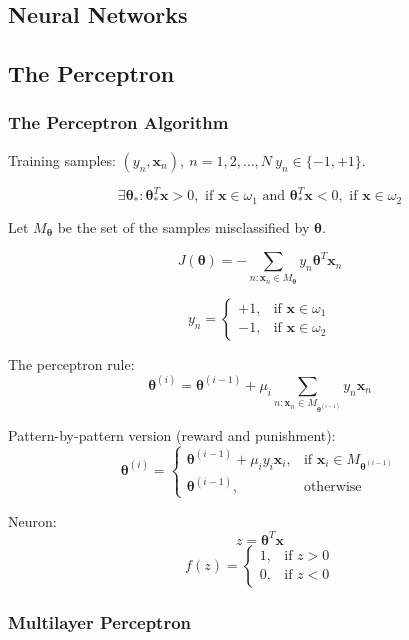 \documentclass{article}
\begin{document}
\begin{multicols}{2}
\section{Neural Networks}

\subsection{The Perceptron}

\subsubsection*{The Perceptron Algorithm}

Training samples: $(y_n, \symbf{x}_n),\ n=1, 2, \ldots, N\ y_n \in \{-1, +1\}$.

\[\exists \symbf{\theta}_*: \symbf{\theta}_*^T \symbf{x} > 0,\text{ if }\symbf{x} \in \omega_1\text{ and }\symbf{\theta}_*^T \symbf{x} < 0,\text{ if }\symbf{x} \in \omega_2\]

Let $M_{\symbf{\theta}}$ be the set of the samples misclassified by $\symbf{\theta}$.

\[J(\symbf{\theta}) = - \sum_{n: \symbf{x}_n \in M_{\symbf{\theta}}} y_n \symbf{\theta}^T \symbf{x}_n\]

\[y_n = \begin{cases}
	+1, & \text{if } \symbf{x} \in \omega_1 \\
	-1, & \text{if } \symbf{x} \in \omega_2
\end{cases}\]

The perceptron rule:
\[\symbf{\theta}^{(i)} = \symbf{\theta}^{(i-1)} + \mu_i \sum_{n: \symbf{x}_n \in M_{\symbf{\theta}^{(i-1)}}} y_n \symbf{x}_n\]

Pattern-by-pattern version (reward and punishment):
\[\symbf{\theta}^{(i)} = \begin{cases}
	\symbf{\theta}^{(i-1)} + \mu_i y_i \symbf{x}_i, &\text{if } \symbf{x}_i \in M_{\symbf{\theta}^{(i-1)}} \\
	\symbf{\theta}^{(i-1)}, &\text{otherwise}
\end{cases}\]

Neuron:
\[z = \symbf{\theta}^T \symbf{x}\]
\[f(z) = \begin{cases}
	1, & \text{if } z > 0 \\
	0, & \text{if } z < 0
\end{cases}\]

\subsubsection*{Multilayer Perceptron}


\end{multicols}
\end{document}
